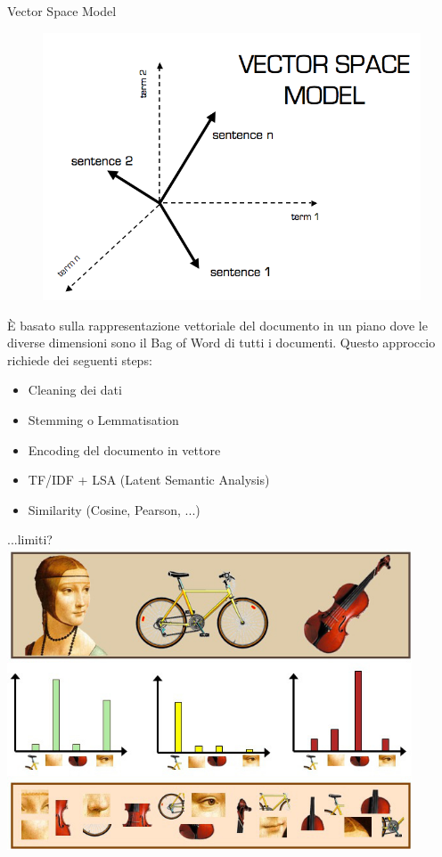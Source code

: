 \documentclass[british]{beamer}
\begin{document}
\begin{frame}{Vector Space Model}
	\begin{figure}
		\includegraphics[width=1.1\linewidth,height=0.4\textwidth]{./Imgs/vector_space.png}
	\end{figure}	
	\`{E} basato sulla rappresentazione vettoriale del documento in un piano dove le diverse dimensioni sono il Bag of Word di tutti i documenti.
	Questo approccio richiede dei seguenti steps:
	\begin{itemize}
		\item Cleaning dei dati
		\item Stemming o Lemmatisation
		\item Encoding del documento in vettore
		\item TF/IDF + LSA (Latent Semantic Analysis)
		\item Similarity (Cosine, Pearson, ...)
	\end{itemize}
\end{frame}
	
\begin{frame}{...limiti?}
	\includegraphics[width=0.9\textwidth, height=0.8\textheight]{./Imgs/bow-example.jpeg}
\end{frame}
	
\end{document}
